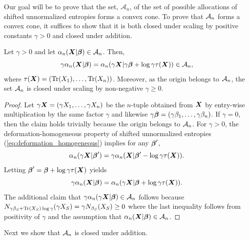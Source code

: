 \documentclass[notitlepage, 10pt]{article}
\begin{document}
Our goal will be to prove that the set, $\mathcal A_n$, of the set of possible allocations of shifted unnormalized entropies forms a convex cone.
To prove that $\mathcal A_n$ forms a convex cone, it suffices to show that it is both closed under scaling by positive constants $\gamma > 0$ and closed under addition.
\begin{lem}
    \label{lem:scalable}
    Let $\gamma > 0$ and let $\alpha_{n}(\boldsymbol{X} | \boldsymbol{\beta}) \in \mathcal A_{n}$.
    Then,
    \begin{equation}
        \gamma \alpha_{n}(\boldsymbol{X}|\boldsymbol{\beta}) = \alpha_{n}(\gamma \boldsymbol{X} | \gamma \boldsymbol{\beta} + \log \gamma \tau (\boldsymbol{X})) \in \mathcal A_{n},
    \end{equation}
    where $\tau(\boldsymbol{X}) = (\operatorname{Tr}(X_1), \ldots, \operatorname{Tr}(X_n))$.
    Moreover, as the origin belongs to $\mathcal A_{n}$, the set $\mathcal A_{n}$ is closed under scaling by non-negative $\gamma \geq 0$.
\end{lem}
\begin{proof}
    Let $\gamma \boldsymbol{X} = (\gamma X_1, \ldots, \gamma X_n)$ be the $n$-tuple obtained from $\boldsymbol{X}$ by entry-wise multiplication by the same factor $\gamma$ and likewise $\gamma \boldsymbol{\beta} = (\gamma \beta_1, \ldots, \gamma \beta_n)$.
    If $\gamma = 0$, then the claim holds trivially because the origin belongs to $\mathcal A_{n}$.
    For $\gamma > 0$, the deformation-homogeneous property of shifted unnormalized entropies (\cref{eq:deformation_homogeneous}) implies for any $\boldsymbol{\beta}'$,
    \begin{equation}
        \alpha_{n}(\gamma \boldsymbol{X}|\boldsymbol{\beta}') = \gamma \alpha_{n}(\boldsymbol{X}|\boldsymbol{\beta}' - \log \gamma \tau(\boldsymbol{X})).
    \end{equation}
    Letting $\boldsymbol{\beta}' = \boldsymbol{\beta} + \log \gamma \tau (\boldsymbol{X})$ yields 
    \begin{equation}
        \gamma \alpha_{n}(\boldsymbol{X}|\boldsymbol{\beta}) = \alpha_{n}(\gamma \boldsymbol{X}|\boldsymbol{\beta} + \log \gamma \tau(\boldsymbol{X})).
    \end{equation}
    The additional claim that $\gamma \alpha_{n}(\gamma \boldsymbol{X}|\boldsymbol{\beta}) \in \mathcal A_n$ follows because $N_{\gamma \beta_S+\operatorname{Tr}(X_S)\log \gamma}(\gamma X_S) = \gamma N_{\beta_S}(X_S) \geq 0$ where the last inequality follows from positivity of $\gamma$ and the assumption that $\alpha_{n}(\boldsymbol{X}|\boldsymbol{\beta}) \in \mathcal A_n$.
\end{proof}
Next we show that $\mathcal A_{n}$ is closed under addition.
\end{document}

